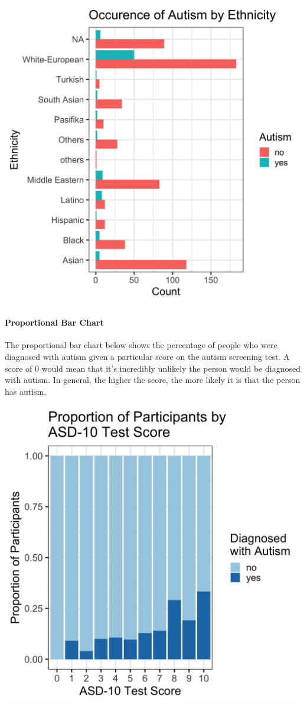 \documentclass[
]{article}
\begin{document}
\includegraphics{../images/barplot.png}

\hypertarget{proportional-bar-chart}{%
\paragraph{Proportional Bar Chart}\label{proportional-bar-chart}}

The proportional bar chart below shows the percentage of people who were
diagnosed with autism given a particular score on the autism screening
test. A score of 0 would mean that it's incredibly unlikely the person
would be diagnosed with autism. In general, the higher the score, the
more likely it is that the person has autism.

\includegraphics{../images/propbarplot.png}
\end{document}
